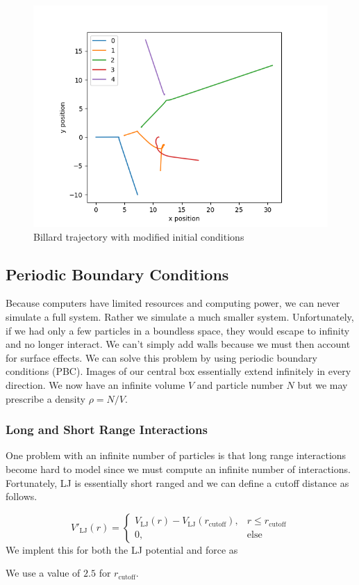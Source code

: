 \documentclass[11pt,a4paper]{scrartcl}
\newcommand{\listfile}[7][MyPythonStyle]{
}
\begin{document}
\begin{figure}[h]
\includegraphics[width=0.7\linewidth]{../fig/billardplt.png}
  \centering
  \caption{Billard trajectory with modified initial conditions}
\label{fig:bplot}
\end{figure}
\subsection{Periodic Boundary Conditions}
Because computers have limited resources and computing power, we can never simulate a full system. Rather we simulate a much smaller system. Unfortunately, if we had only a few particles in a boundless space, they would escape to infinity and no longer interact. We can't simply add walls because we must then account for surface effects. We can solve this problem by using periodic boundary conditions (PBC).  Images of our central box essentially extend infinitely in every direction. We now have an infinite volume $V$ and particle number $N$ but we may prescribe a density $\rho = N/V$.
\subsubsection{Long and Short Range Interactions}
One problem with an infinite number of particles is that long range interactions become hard to model since we must compute an infinite number of interactions. Fortunately, LJ is essentially short ranged and we can define a cutoff distance as follows.

\begin{equation*}
V'_\mathrm{LJ}(r)=\begin{cases}
V_\mathrm{LJ}(r) - V_\mathrm{LJ}(r_\mathrm{cutoff}), & r \leq r_\mathrm{cutoff}\\
0, & \text{else}
\end{cases}
\end{equation*}
We implent this for both the LJ potential and force as
 \listfile{../src/ljlib.py}{/src/ljlib.py}{21}{35}{LJ Cutoff}{cuttoff}
We use a value of $2.5$ for $r_\mathrm{cutoff}$.
\end{document}
